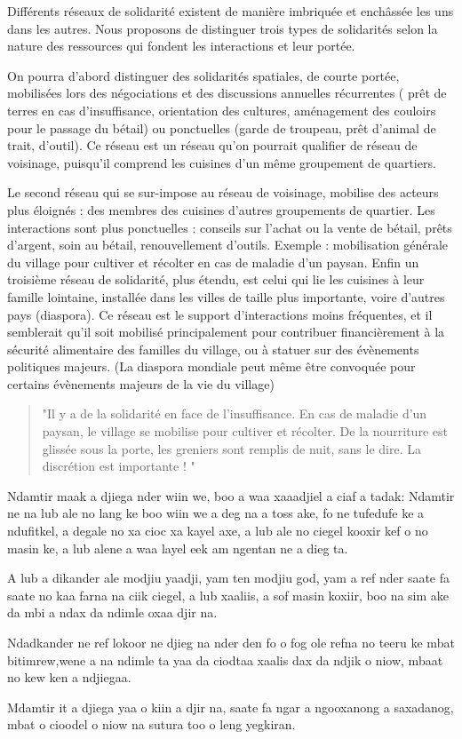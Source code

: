 \begin{paracol}{2}
  Différents réseaux de solidarité existent de manière imbriquée et enchâssée les uns dans les autres. Nous proposons de distinguer trois types de solidarités selon la nature des ressources qui fondent les interactions et leur portée.

  On pourra d'abord distinguer des solidarités spatiales, de courte portée,  mobilisées lors des négociations et des discussions annuelles récurrentes ( prêt de terres en cas d'insuffisance, orientation des cultures, aménagement des couloirs pour le passage du bétail) ou ponctuelles (garde de troupeau, prêt d'animal de trait, d'outil).
  Ce réseau est un réseau qu'on pourrait qualifier de réseau de voisinage, puisqu'il comprend les cuisines d'un même groupement de quartiers.

  Le second réseau qui se sur-impose au réseau de voisinage, mobilise des acteurs plus éloignés : des membres des cuisines d'autres groupements de quartier.
  Les interactions sont plus ponctuelles : conseils sur l'achat ou la vente de bétail, prêts d'argent, soin au bétail, renouvellement d'outils. Exemple : mobilisation générale du village pour cultiver et récolter en cas de maladie d'un paysan.
  Enfin un troisième réseau de solidarité, plus étendu, est celui qui lie les cuisines à leur famille lointaine, installée dans les villes de taille plus importante, voire d'autres pays (diaspora).
  Ce réseau est le support d'interactions  moins fréquentes, et il semblerait qu'il soit mobilisé principalement pour contribuer financièrement à la sécurité alimentaire des familles du village, ou à statuer sur des évènements politiques majeurs. (La diaspora mondiale peut même être convoquée pour certains évènements majeurs de la vie du village)

  \begin{quote}
    "Il y a de la solidarité en face de l’insuffisance. En cas de maladie d’un paysan, le village se mobilise pour cultiver et récolter. De la nourriture est glissée sous la porte, les greniers sont remplis de nuit, sans le dire. La discrétion est importante ! "
  \end{quote}

  \switchcolumn %

  Ndamtir maak a djiega nder wiin we, boo a waa xaaadjiel a ciaf a tadak: Ndamtir ne na lub ale no lang ke boo wiin we a deg na a toss ake, fo ne tufedufe ke a ndufitkel, a degale no xa cioc xa kayel axe, a lub ale no ciegel kooxir kef o no masin ke, a lub alene a waa layel eek am ngentan ne a dieg ta.

  A lub a dikander ale modjiu yaadji, yam ten modjiu god, yam a ref nder saate fa saate no kaa farna na ciik ciegel, a lub xaaliis, a sof masin koxiir, boo na sim ake da mbi a ndax da ndimle oxaa djir na.

  Ndadkander ne ref lokoor ne djieg na nder den fo o fog ole refna no teeru ke mbat bitimrew,wene a na ndimle ta yaa da ciodtaa xaalis dax da ndjik o niow, mbaat no kew ken a ndjiegaa.

  Mdamtir it a djiega yaa o kiin a djir na, saate fa ngar a ngooxanong a saxadanog, mbat o cioodel o niow na sutura too o leng yegkiran.


\end{paracol}

